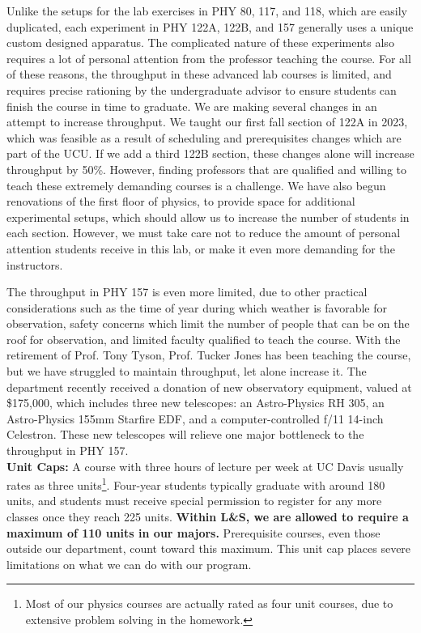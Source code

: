 \documentclass[12pt]{article}
\begin{document}
Unlike the setups for the lab exercises in PHY 80, 117, and 118,
which are easily duplicated, each experiment in PHY 122A, 122B, and
157 generally uses a unique custom designed apparatus.  The
complicated nature of these experiments also requires a lot of personal
attention from the professor teaching the course.  For all of these
reasons, the throughput in these advanced lab courses is limited, and
requires precise rationing by the undergraduate advisor to ensure
students can finish the course in time to graduate.  We are making
several changes in an attempt to increase throughput.  We taught our
first fall section of 122A in 2023, which was feasible as a result of
scheduling and prerequisites changes which are part of the UCU.  If we
add a third 122B section, these changes alone will increase throughput
by 50\%.  However, finding professors that are qualified and willing
to teach these extremely demanding courses is a challenge.  We have
also begun renovations of the first floor of physics, to provide space
for additional experimental setups, which should allow us to increase
the number of students in each section.  However, we must take care
not to reduce the amount of personal attention students receive in
this lab, or make it even more demanding for the instructors.

The throughput in PHY 157 is even more limited, due to other practical
considerations such as the time of year during which weather is
favorable for observation, safety concerns which limit the number of
people that can be on the roof for observation, and limited faculty
qualified to teach the course.  With the retirement of Prof. Tony
Tyson, Prof. Tucker Jones has been teaching the course, but we have
struggled to maintain throughput, let alone increase it.  The department recently received a donation of new observatory equipment, valued at \$175,000, which includes three new telescopes: an Astro-Physics RH 305, an Astro-Physics 155mm Starfire EDF, and a computer-controlled f/11 14-inch Celestron.  These new telescopes will relieve one major bottleneck to the throughput in PHY 157.\\[3pt]

\noindent
{\bf Unit Caps:} A course with three hours of lecture per week
at UC Davis usually rates as three units\footnote{Most of our physics courses
  are actually rated as four unit courses, due to extensive problem
  solving in the homework.}.  Four-year students typically graduate
with around 180 units, and students must receive special permission to
register for any more classes once they reach 225 units.  {\bf Within
  L\&S, we are allowed to require a maximum of 110 units in our
  majors.} Prerequisite courses, even those outside our department,
count toward this maximum.  This unit cap places severe limitations on
what we can do with our program.
\end{document}
